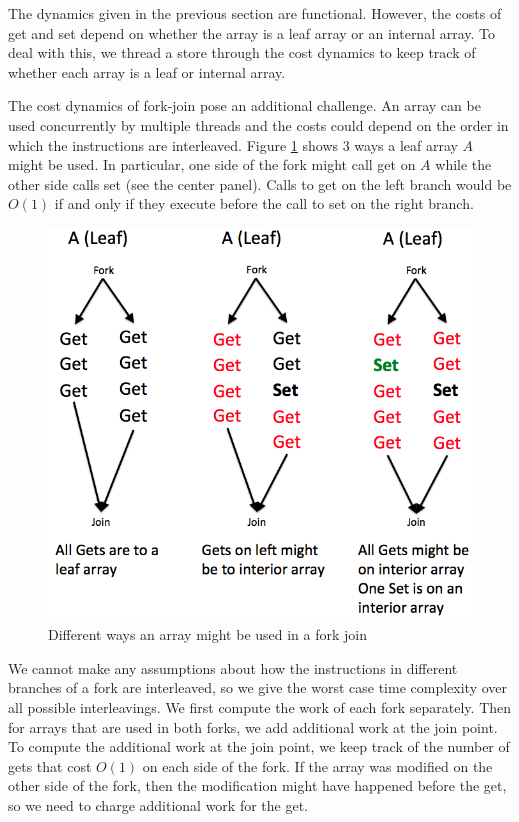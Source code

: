 \documentclass[preprint]{sigplanconf}
\begin{document}
The dynamics given in the previous section are functional. However, the costs of get and set depend on whether the array is a leaf array or an internal array. To deal with this, we thread a store through the cost dynamics to keep track of whether each array is a leaf or internal array.

The cost dynamics of fork-join pose an additional challenge. An array can be used concurrently by multiple threads and the costs could depend on the order in which the instructions are interleaved. Figure \ref{fig:fork_join_intuition} shows 3 ways a leaf array $A$ might be used. In particular, one side of the fork might call get on $A$ while the other side calls set (see the center panel). Calls to get on the left branch would be $O(1)$ if and only if they execute before the call to set on the right branch.

\begin{figure}[!ht]
\centering
\includegraphics[scale=0.3]{fork_join_intuition}
\nocaptionrule \caption{Different ways an array might be used in a fork join}
\label{fig:fork_join_intuition}
\end{figure}

We cannot make any assumptions about how the instructions in different branches of a fork are interleaved, so we give the worst case time complexity over all possible interleavings. We first compute the work of each fork separately. Then for arrays that are used in both forks, we add additional work at the join point. To compute the additional work at the join point, we keep track of the number of gets that cost $O(1)$ on each side of the fork. If the array was modified on the other side of the fork, then the modification might have happened before the get, so we need to charge additional work for the get.
\end{document}
